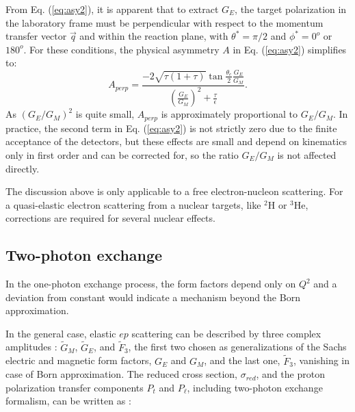 From Eq. (\ref{eq:asy2}), it is apparent that to extract $G_{E}$, the target polarization 
in the laboratory frame must be perpendicular with respect to the momentum transfer vector ${\vec q}$
and within the reaction plane, with $\theta^{\ast}= \pi/2$ and $\phi^{\ast}= 0^o$ or $180^o$. 
For these conditions, the physical asymmetry $A$ in Eq. (\ref{eq:asy2}) simplifies to:
\begin{equation}
A_{perp}=\frac{-2\sqrt{\tau(1+\tau)}\tan\frac{\theta_e}{2} \frac{G_E}{G_M}}{(\frac{G_E}{G_M})^2+\frac{\tau}{\epsilon}}.
\label{eq:asy3}
\end{equation}
\noindent
As $(G_E/G_M)^2$ is quite small, $A_{perp}$ is approximately proportional to $G_E/G_M$. In practice, the second term in 
Eq. (\ref{eq:asy2}) is not strictly zero due to the finite acceptance of the detectors, but these effects are small and depend
on kinematics only in first order and can be corrected for, so the ratio $G_E/G_M$ is not affected directly.

The discussion above is only applicable to a free electron-nucleon scattering. 
For a quasi-elastic electron scattering from a nuclear targets, like $^2$H or $^3$He, corrections are required for several nuclear effects. 

\subsection{Two-photon exchange}

In the one-photon exchange process, the form factors depend only on $Q^2$
and a deviation from constant would indicate a mechanism beyond
the Born approximation. 

In the general case, 
elastic $ep$ scattering can be described by three
complex amplitudes \cite{diehl:2013,guichon,afanbrod,kivel:2012}:  $\tilde{G}_M$, $\tilde{G}_E$,
and $\tilde{F}_3$, the first two 
chosen as generalizations of the Sachs 
electric and magnetic form factors, $G_E$ and $G_M$, and the 
last one, $\tilde{F}_3$, vanishing in case of Born approximation.
The reduced cross section, $\sigma _{red}$, and the
proton polarization transfer components $P_t$ and $P_{\ell}$,
including two-photon exchange formalism, can be written as \cite{guichon}:

